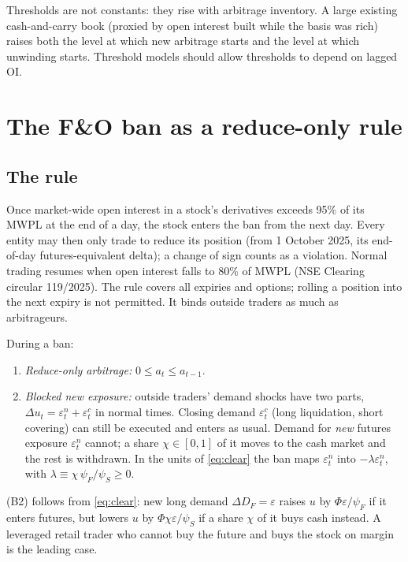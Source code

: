 \begin{emcontent}
Thresholds are not constants: they rise with arbitrage inventory. A large existing cash-and-carry book (proxied by
open interest built while the basis was rich) raises both the level at which new arbitrage starts and the level at which
unwinding starts. Threshold models should allow thresholds to depend on lagged OI.
\end{emcontent}

\section{The F\&O ban as a reduce-only rule}\label{sec:ban}
\subsection{The rule}
Once market-wide open interest in a stock's derivatives exceeds 95\% of its MWPL at the end of a day, the stock enters the
ban from the next day. Every entity may then only trade to reduce its position (from 1 October 2025, its end-of-day
futures-equivalent delta); a change of sign counts as a violation. Normal trading resumes when open interest falls to
80\% of MWPL (NSE Clearing circular 119/2025). The rule covers all expiries and options; rolling a position into the next
expiry is not permitted. It binds outside traders as much as arbitrageurs.

\begin{assumption}[Ban]\label{as:ban}
During a ban:
\begin{enumerate}[label=(B\arabic*),leftmargin=2.2em,itemsep=1pt]
\item \emph{Reduce-only arbitrage:} $0\le a_t\le a_{t-1}$.
\item \emph{Blocked new exposure:} outside traders' demand shocks have two parts, $\Delta u_t=\varepsilon^n_t+\varepsilon^c_t$
in normal times. Closing demand $\varepsilon^c_t$ (long liquidation, short covering) can still be executed and enters as
usual. Demand for \emph{new} futures exposure $\varepsilon^n_t$ cannot; a share $\chi\in[0,1]$ of it moves to the cash
market and the rest is withdrawn. In the units of \eqref{eq:clear} the ban maps $\varepsilon^n_t$ into
$-\lambda\varepsilon^n_t$, with $\lambda\equiv\chi\,\psi_F/\psi_S\ge 0$.
\end{enumerate}
\end{assumption}
(B2) follows from \eqref{eq:clear}: new long demand $\Delta D_F=\varepsilon$ raises $u$ by $\Phi\varepsilon/\psi_F$ if it
enters futures, but lowers $u$ by $\Phi\chi\varepsilon/\psi_S$ if a share $\chi$ of it buys cash instead. A leveraged
retail trader who cannot buy the future and buys the stock on margin is the leading case.

